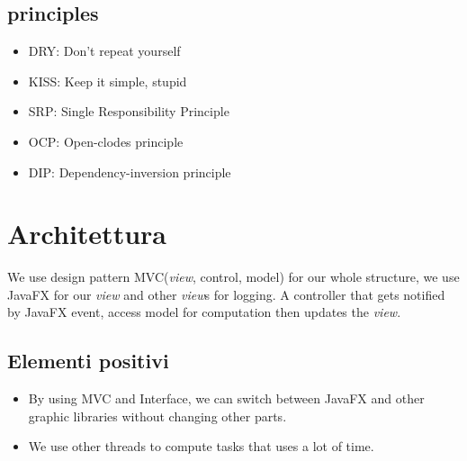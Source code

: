 \documentclass[a4paper,12pt]{report}
\begin{document}
\subsection*{principles}
\begin{itemize}
    \item DRY: Don’t repeat yourself 
    \item KISS: Keep it simple, stupid 
    \item SRP: Single Responsibility Principle
    \item OCP: Open-clodes principle
    \item DIP: Dependency-inversion principle
\end{itemize}

\section{Architettura}
    We use design pattern MVC(\textit{view}, control, model) for our whole structure, we use JavaFX for our \textit{view} and other \textit{view}s for logging.  
    A controller that gets notified by JavaFX event, access model for computation then updates the \textit{view}.  

\subsection*{Elementi positivi}
\begin{itemize}
    \item By using MVC and Interface, we can switch between JavaFX and other graphic libraries without changing other parts. 
    \item We use other threads to compute tasks that uses a lot of time.
\end{itemize}
\end{document}
